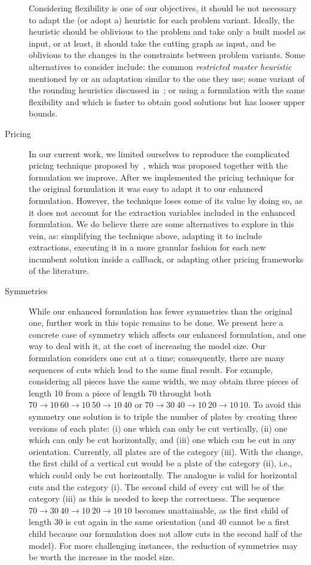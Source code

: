 \documentclass[ppgc,prop-tese,english,formais,babel]{iiufrgs}
\begin{document}
\begin{description}
	Considering flexibility is one of our objectives, it should be not necessary to adapt the (or adopt a) heuristic for each problem variant.
	Ideally, the heuristic should be oblivious to the problem and take only a built model as input, or at least, it should take the cutting graph as input, and be oblivious to the changes in the constraints between problem variants.
	Some alternatives to consider include: the common \emph{restricted master heuristic} mentioned by \citet{delorme:2019} or an adaptation similar to the one they use; some variant of the rounding heuristics discussed in~\citet{alvarez:2002:LP}; or using a formulation with the same flexibility and which is faster to obtain good solutions but has looser upper bounds.
\item[Pricing]
	In our current work, we limited ourselves to reproduce the complicated pricing technique proposed by~\citet{furini:2016}, which was proposed together with the formulation we improve.
	After we implemented the pricing technique for the original formulation it was easy to adapt it to our enhanced formulation. However, the technique loses some of its value by doing so, as it does not account for the extraction variables included in the enhanced formulation.
	We do believe there are some alternatives to explore in this vein, as: simplifying the technique above, adapting it to include extractions, executing it in a more granular fashion for each new incumbent solution inside a callback, or adapting other pricing frameworks of the literature.
\item[Symmetries]
	While our enhanced formulation has fewer symmetries than the original one, further work in this topic remains to be done.
	We present here a concrete case of symmetry which affects our enhanced formulation, and one way to deal with it, at the cost of increasing the model size.
	Our formulation considers one cut at a time; consequently, there are many sequences of cuts which lead to the same final result.
	For example, considering all pieces have the same width, we may obtain three pieces of length 10 from a piece of length 70 throught both \(70 \rightarrow 10~60 \rightarrow 10~50 \rightarrow 10~40\) or \(70 \rightarrow 30~40 \rightarrow 10~20 \rightarrow 10~10\).
	To avoid this symmetry one solution is to triple the number of plates by creating three versions of each plate: (i) one which can only be cut vertically, (ii) one which can only be cut horizontally, and (iii) one which can be cut in any orientation.
	Currently, all plates are of the category (iii).
	With the change, the first child of a vertical cut would be a plate of the category (ii), i.e., which could only be cut horizontally. The analogue is valid for horizontal cuts and the category (i). The second child of every cut will be of the category (iii) as this is needed to keep the correctness.
	The sequence \(70 \rightarrow 30~40 \rightarrow 10~20 \rightarrow 10~10\) becomes unattainable, as the first child of length 30 is cut again in the same orientation (and \(40\) cannot be a first child because our formulation does not allow cuts in the second half of the model).
	For more challenging instances, the reduction of symmetries may be worth the increase in the model size.
\end{description}
\end{document}
